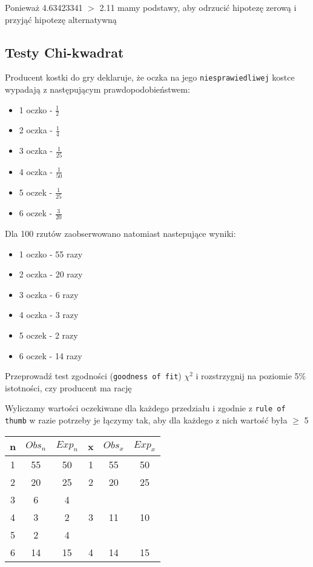 \documentclass[main.tex]{subfiles}
\begin{document}
    Ponieważ 4.63423341 $>$ 2.11 mamy podstawy, aby odrzucić hipotezę zerową i przyjąć hipotezę alternatywną


    \subsection{Testy Chi-kwadrat}
    \begin{exercise}
        Producent kostki do gry deklaruje, że oczka na jego \texttt{niesprawiedliwej} kostce wypadają z następującym prawdopodobieństwem:
        \begin{itemize}
            \item 1 oczko - $\frac{1}{2}$
            \item 2 oczka - $\frac{1}{4}$
            \item 3 oczka - $\frac{1}{25}$
            \item 4 oczka - $\frac{1}{50}$
            \item 5 oczek - $\frac{1}{25}$
            \item 6 oczek - $\frac{3}{20}$
        \end{itemize}
        Dla 100 rzutów zaobserwowano natomiast nastepujące wyniki:
        \begin{itemize}
            \item 1 oczko - 55 razy
            \item 2 oczka - 20 razy
            \item 3 oczka - 6 razy
            \item 4 oczka - 3 razy
            \item 5 oczek - 2 razy
            \item 6 oczek - 14 razy
        \end{itemize}
        Przeprowadź test zgodności (\texttt{goodness of fit}) $\chi^{2}$ i rozstrzygnij na poziomie 5\% istotności, czy producent ma rację
    \end{exercise}

    Wyliczamy wartości oczekiwane dla każdego przedziału i zgodnie z \texttt{rule of thumb} w razie potrzeby je łączymy tak, aby dla każdego z nich wartość była $\geq$ 5

    \begin{table}[H]
        \centering
        \begin{tabular}{|c|c|c|c|c|c|}
            \hline
            n & $Obs_{n}$ & $Exp_{n}$ & x & $Obs_{x}$           & $Exp_{x}$           \\ \hline
            1 & 55 & 50 & 1 & 55 & 50                  \\ \hline
            2 & 20 & 25 & 2 & 20 & 25                  \\ \hline
            3 & 6 & 4 & \multirow{3}{*}{3} & \multirow{3}{*}{11} & \multirow{3}{*}{10} \\ \cline{1-3}
            4 & 3 & 2 & & &                     \\ \cline{1-3}
            5 & 2 & 4 & & &                     \\ \hline
            6 & 14 & 15 & 4 & 14 & 15                  \\ \hline
        \end{tabular}
    \end{table}
\end{document}
